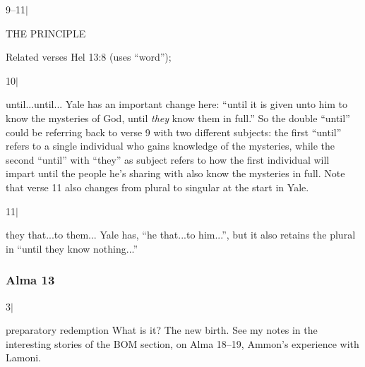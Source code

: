 		\begin{compactdesc}
		
		\item[9--11$\vert$]
		\begin{compactdesc}
		\item[THE PRINCIPLE] \textbf{}
			\begin{compactdesc}
			\item[Related verses] Hel 13:8 (uses ``word'');
			\end{compactdesc}
		\end{compactdesc}
		
		\item[10$\vert$]
		\begin{compactdesc}
		\item[until...until...] Yale has an important change here: ``until it is given unto him to know the mysteries of God, until \textit{they} know them in full.'' So the double ``until'' could be referring back to verse 9 with two different subjects: the first ``until'' refers to a single individual who gains knowledge of the mysteries, while the second ``until'' with ``they'' as subject refers to how the first individual will impart until the people he's sharing with also know the mysteries in full.
		Note that verse 11 also changes from plural to singular at the start in Yale.
		\end{compactdesc}
		
		\item[11$\vert$]
		\begin{compactdesc}
		\item[they that...to them...] Yale has, ``he that...to him...'', but it also retains the plural in ``until they know nothing...''
		\end{compactdesc}
		
		\end{compactdesc}

	\subsubsection{Alma 13} %

		\begin{compactdesc}

		\item[3$\vert$]
		\begin{compactdesc}
		\item[preparatory redemption] What is it? The new birth. See my notes in the interesting stories of the BOM section, on Alma 18--19, Ammon's experience with Lamoni. 
		\end{compactdesc}

		\end{compactdesc}

